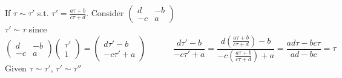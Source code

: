 \documentclass{book}
\begin{document}
If $\tau \sim \tau'$ s.t. $\tau' = \frac{ a\tau + b}{ c\tau +d }$.  Consider $\left( \begin{matrix} d & - b \\ -c & a \end{matrix} \right)$   \\

$\tau' \sim \tau$ since 
\[
\left( \begin{matrix} d & -b \\ -c & a \end{matrix} \right) \left( \begin{matrix} \tau' \\ 1 \end{matrix} \right) = \left( \begin{matrix} d\tau' - b  \\ -c\tau' + a \end{matrix} \right) \quad \quad \quad \, \frac{ d \tau' - b }{ -c\tau' + a } = \frac{ d \left( \frac{ a \tau + b }{ c\tau + d } \right) - b }{ -c \left( \frac{ a\tau + b }{ c\tau + d } \right) + a } = \frac{ ad \tau - bc \tau }{ ad-bc } = \tau 
\]
Given $\tau \sim \tau'$, $\tau' \sim \tau''$
\end{document}
